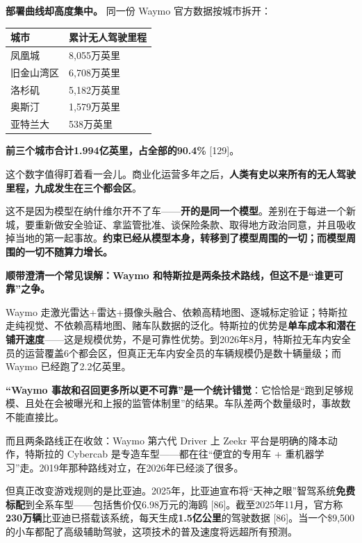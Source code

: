\documentclass[11pt,a4paper]{ctexart}
\begin{document}
\textbf{部署曲线却高度集中。} 同一份 Waymo 官方数据按城市拆开：

\begin{center}

\begin{tabularx}{\textwidth}{lX}
\toprule
城市 & 累计无人驾驶里程 \\
\midrule
凤凰城 & 8,055万英里 \\
旧金山湾区 & 6,708万英里 \\
洛杉矶 & 5,182万英里 \\
奥斯汀 & 1,579万英里 \\
亚特兰大 & 538万英里 \\
\bottomrule
\end{tabularx}
\end{center}

\textbf{前三个城市合计1.994亿英里，占全部的90.4\%}{} [129]。

这个数字值得盯着看一会儿。商业化运营多年之后，\textbf{人类有史以来所有的无人驾驶里程，九成发生在三个都会区}。

这不是因为模型在纳什维尔开不了车——\textbf{开的是同一个模型}。差别在于每进一个新城，要重新做安全验证、拿监管批准、谈保险条款、取得地方政治同意，并且吸收掉当地的第一起事故。\textbf{约束已经从模型本身，转移到了模型周围的一切；而模型周围的一切不随算力增长。}

\textbf{顺带澄清一个常见误解：Waymo 和特斯拉是两条技术路线，但这不是“谁更可靠”之争。}

Waymo 走激光雷达+雷达+摄像头融合、依赖高精地图、逐城标定验证；特斯拉走纯视觉、不依赖高精地图、赌车队数据的泛化。特斯拉的优势是\textbf{单车成本和潜在铺开速度}——这是规模优势，不是可靠性优势。到2026年8月，特斯拉无车内安全员的运营覆盖6个都会区，但真正无车内安全员的车辆规模仍是数十辆量级；而 Waymo 已经跑了2.2亿英里。

\textbf{“Waymo 事故和召回更多所以更不可靠”是一个统计错觉}：它恰恰是“跑到足够规模、且处在会被曝光和上报的监管体制里”的结果。车队差两个数量级时，事故数不能直接比。

而且两条路线正在收敛：Waymo 第六代 Driver 上 Zeekr 平台是明确的降本动作，特斯拉的 Cybercab 是专造车型——都在往“便宜的专用车 + 重机器学习”走。2019年那种路线对立，在2026年已经淡了很多。

但真正改变游戏规则的是比亚迪。2025年，比亚迪宣布将“天神之眼”智驾系统\textbf{免费标配}到全系车型——包括售价仅6.98万元的海鸥 [86]。截至2025年11月，官方称\textbf{230万辆}比亚迪已搭载该系统，每天生成\textbf{1.5亿公里}的驾驶数据 [86]。当一个\$9,500的小车都配了高级辅助驾驶，这项技术的普及速度将远超所有预测。
\end{document}
